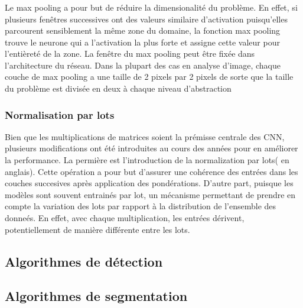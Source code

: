 \subsubsection{ \fg{}}
Le max pooling a pour but de réduire la dimensionalité du problème. En effet, si plusieurs fenêtres successives ont des valeurs similaire d'activation puisqu'elles parcourent sensiblement la même zone du domaine, la fonction max pooling trouve le neurone qui a l'activation la plus forte et assigne cette valeur pour l'entièreté de la zone. La fenêtre du max pooling peut être fixée dans l'architecture du réseau. Dans la plupart des cas en analyse d'image, chaque couche de max pooling a une taille de 2 pixels par 2 pixels de sorte que la taille du problème est divisée en deux à chaque niveau d'abstraction

\subsubsection{Normalisation par lots}
Bien que les multiplications de matrices soient la prémisse centrale des \ac{CNN}, plusieurs modifications ont été introduites au cours des années pour en améliorer la performance. La permière est l'introduction de la normalization par lots( \fg{} en anglais). Cette opération a pour but d'assurer une cohérence des entrées dans les couches succesives après application des pondérations. D'autre part, puisque les modèles sont souvent entrainés par lot, un mécanisme permettant de prendre en compte la variation des lots par rapport à la distribution de l'ensemble des donneés. En effet, avec chaque multiplication, les entrées dérivent, potentiellement de manière différente entre les lots.

\subsection{Algorithmes de détection}

\subsection{Algorithmes de segmentation}

